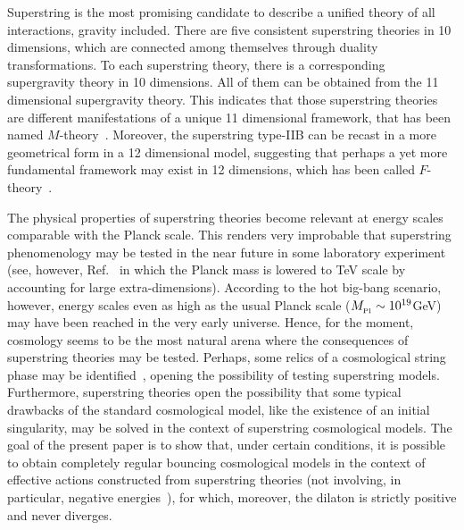 \documentclass[a4paper,aps,twocolumn,prd,showpacs,nofootinbib]{revtex4}
\newcommand{\mP}{M_{_{\rm Pl}}}
\begin{document}
Superstring is the most promising candidate to describe a unified
theory of all interactions, gravity included. There are five
consistent superstring theories in 10 dimensions, which are connected
among themselves through duality transformations. To each superstring
theory, there is a corresponding supergravity theory in 10
dimensions. All of them can be obtained from the 11 dimensional
supergravity theory. This indicates that those superstring theories
are different manifestations of a unique 11 dimensional framework,
that has been named
$M$-theory~\cite{polchinski,green,kiritsis}. Moreover, the superstring
type-IIB can be recast in a more geometrical form in a 12 dimensional
model, suggesting that perhaps a yet more fundamental framework may
exist in 12 dimensions, which has been called $F$-theory~\cite{pope}.

The physical properties of superstring theories become relevant at
energy scales comparable with the Planck scale. This renders very
improbable that superstring phenomenology may be tested in the near
future in some laboratory experiment (see, however, Ref.~\cite{randal}
in which the Planck mass is lowered to TeV scale by accounting for
large extra-dimensions). According to the hot big-bang scenario,
however, energy scales even as high as the usual Planck scale
($\mP\sim 10^{19}$GeV) may have been reached in the very early
universe. Hence, for the moment, cosmology seems to be the most
natural arena where the consequences of superstring theories may be
tested. Perhaps, some relics of a cosmological string phase may be
identified~\cite{bdp}, opening the possibility of testing superstring
models. Furthermore, superstring theories open the possibility that
some typical drawbacks of the standard cosmological model, like the
existence of an initial singularity, may be solved in the context of
superstring cosmological models.  The goal of the present paper is to
show that, under certain conditions, it is possible to obtain
completely regular bouncing cosmological models in the context of
effective actions constructed from superstring theories (not
involving, in particular, negative energies~\cite{ppnpn2}), for which,
moreover, the dilaton is strictly positive and never diverges.
\end{document}
